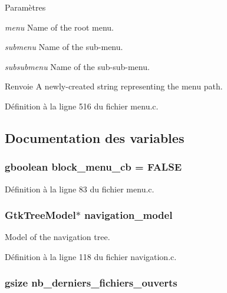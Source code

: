 \begin{DoxyParams}{Paramètres}
\item[{\em menu}]Name of the root menu. \item[{\em submenu}]Name of the sub-\/menu. \item[{\em subsubmenu}]Name of the sub-\/sub-\/menu.\end{DoxyParams}
\begin{DoxyReturn}{Renvoie}
A newly-\/created string representing the menu path. 
\end{DoxyReturn}


Définition à la ligne 516 du fichier menu.c.



\subsection{Documentation des variables}
\subsubsection[{block\_\-menu\_\-cb}]{\setlength{\rightskip}{0pt plus 5cm}gboolean {\bf block\_\-menu\_\-cb} = FALSE}\label{menu_8c_a148929df9268caccbe39dfef840fe42d}


Définition à la ligne 83 du fichier menu.c.

\subsubsection[{navigation\_\-model}]{\setlength{\rightskip}{0pt plus 5cm}GtkTreeModel$\ast$ {\bf navigation\_\-model}}\label{menu_8c_af25f8dd6dec7eb5cb22b4a710e686d29}
Model of the navigation tree. 

Définition à la ligne 118 du fichier navigation.c.

\subsubsection[{nb\_\-derniers\_\-fichiers\_\-ouverts}]{\setlength{\rightskip}{0pt plus 5cm}gsize {\bf nb\_\-derniers\_\-fichiers\_\-ouverts}}\label{menu_8c_a602b7cdee2b4750d17e89e642189e6ba}


